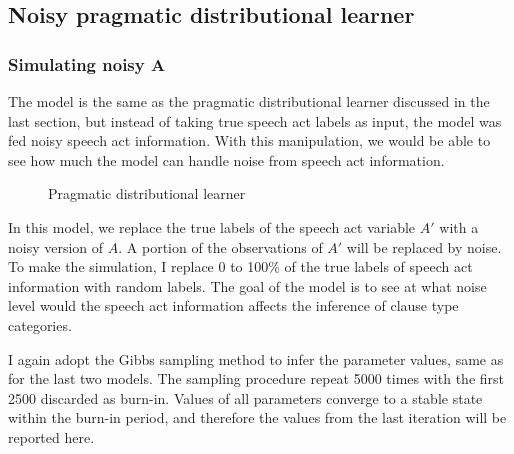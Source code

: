 \subsection{Noisy pragmatic distributional learner}
\label{sec:engcl:model:noisy}

\subsubsection{Simulating noisy A}
The model is the same as the pragmatic distributional learner discussed in the last section, but instead of taking true speech act labels as input, the model was fed noisy speech act information. With this manipulation, we would be able to see how much the model can handle noise from speech act information. 




\begin{figure}[H]
\begin{center}
\end{center}
\caption{Pragmatic distributional learner}\label{fig: noisy-model}
\end{figure}

In this model, we replace the true labels of the speech act variable $A'$ with a noisy version of $A$. A portion of the observations of $A'$ will be replaced by noise. To make the simulation, I replace 0 to 100\% of the true labels of speech act information with random labels. The goal of the model is to see at what noise level would the speech act information affects the inference of clause type categories. 

I again adopt the Gibbs sampling method to infer the parameter values, same as for the last two models. The sampling procedure repeat 5000 times with the first 2500 discarded as burn-in. Values of all parameters converge to a stable state within the burn-in period, and therefore the values from the last iteration will be reported here. 

